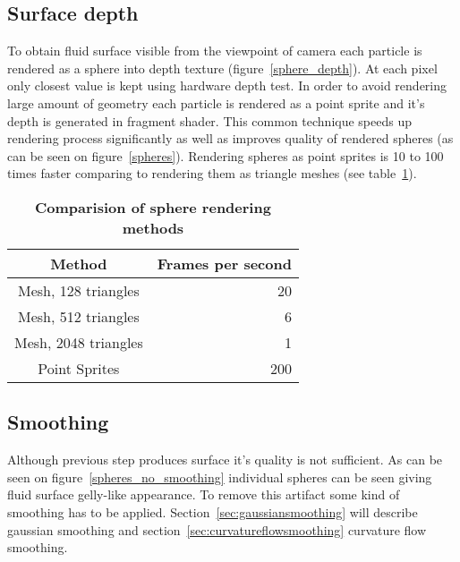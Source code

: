 \subsection{Surface depth} \label{sec:surfacedepth}
To obtain fluid surface visible from the viewpoint of camera each particle is rendered as a sphere into depth texture (figure~\ref{sphere_depth}). At each pixel only closest value is kept using hardware depth test. 
In order to avoid rendering large amount of geometry each particle is rendered as a point sprite and it's depth is generated in fragment shader. This common technique speeds up rendering process significantly as well as improves quality of rendered spheres (as can be seen on figure~\ref{spheres}). Rendering spheres as point sprites is 10 to 100 times faster comparing to rendering them as triangle meshes (see table~\ref{sphere_speed_comp}).
\begin{table}[htdp]
\caption[Comparision of sphere rendering methods]{\textbf{Comparision of sphere rendering methods}}
\centering
\begin{tabular}{cr} 
{\bf Method} & {\bf Frames per second} \\ 
\hline 
Mesh, 128 triangles & 20 \\
Mesh, 512 triangles & 6 \\
Mesh, 2048 triangles   & 1 \\
Point Sprites & 200 \\
\end{tabular}
\label{sphere_speed_comp}
\end{table}

\subsection{Smoothing} 
\label{sec:smoothing}
Although previous step produces surface it's quality is not sufficient. As can be seen on figure~\ref{spheres_no_smoothing} individual spheres can be seen giving fluid surface gelly-like appearance. To remove this artifact some kind of smoothing has to be applied. Section~\ref{sec:gaussiansmoothing} will describe gaussian smoothing and section~\ref{sec:curvatureflowsmoothing} curvature flow smoothing.

